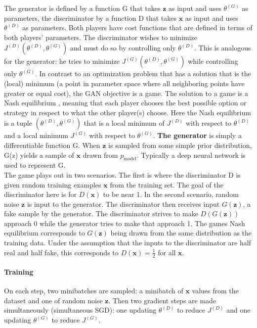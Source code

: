 The generator is defined by a function G that takes $\mathbf{z}$ as input and uses $\theta^{(G)}$ as parameters, the discriminator by a function D that takes $\mathbf{x}$ as input and uses $\theta^{(D)}$ as parameters. Both players have cost functions that are defined in terms of both players' parameters. The discriminator  wishes to minimize $J^{(D)}(\theta^{(D)}, \theta^{(G)})$ and must do so by controlling only $\theta^{(D)}$. This is analogous for the generator: he tries to minimize $J^{(G)}(\theta^{(D)}, \theta^{(G)})$ while controlling only $\theta^{(G)}$. In contrast to an optimization problem that has a solution that is the (local) minimum (a point in parameter space where all neighboring points have greater or equal cost), the GAN objective is a game. The solution to a game is a Nash equilibrium \cite{Nash48}, meaning that each player chooses the best possible option or strategy in respect to what the other player(s) choose. Here the Nash equilibrium is a tuple $(\theta^{(D)}, \theta^{(G)})$ that is a local minimum of $J^{(D)}$ with respect to $\theta^{(D)}$ and a local minimum $J^{(G)}$ with respect to $\theta^{(G)}$.
\textbf{The generator} is simply a differentiable function G. When $\mathbf{z}$ is sampled from some simple prior distribution, G(z) yields a sample of $\mathbf{x}$ drawn from $p_{\text{model}}$. Typically a deep neural network is used to represent G. \\
The game plays out in two scenarios. The first is where the discriminator D is given random training examples $\mathbf{x}$ from the training set. The goal of the discriminator here is for $D(\mathbf{x})$ to be near 1. In the second scenario, random noise $\mathbf{z}$ is input to the generator. The discriminator then receives input $G(\mathbf{z})$, a fake sample by the generator. The discriminator strives to make $D(G(\mathbf{z}))$ approach 0 while the generator tries to make that approach 1. The games Nash equilibrium corresponds to $G(\mathbf{z})$ being drawn from the same distribution as the training data. Under the assumption that the inputs to the discriminator are half real and half fake, this corresponds to $D(\mathbf{x}) = \frac{1}{2}$ for all $\mathbf{x}$.

\paragraph{Training}
On each step, two minibatches are sampled: a minibatch of $\mathbf{x}$ values from the dataset and one of random noise $\mathbf{z}$. Then two gradient steps are made simultaneously (simultaneous SGD): one updating $\theta^{(D)}$ to reduce $J^{(D)}$ and one updating $\theta^{(G)}$ to reduce $J^{(G)}$.

